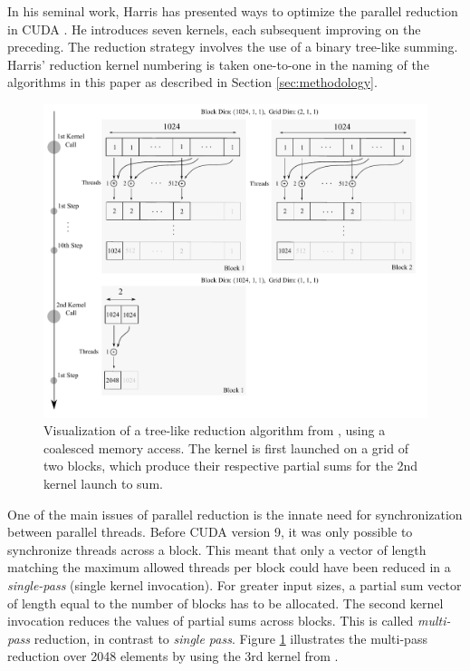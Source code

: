 \documentclass{juliacon}
\begin{document}
In his seminal work, Harris has presented ways to optimize the parallel reduction in CUDA \cite{Harris2007}. He introduces seven kernels, each subsequent improving on the preceding. The reduction strategy involves the use of a binary tree-like summing. Harris' reduction kernel numbering is taken one-to-one in the naming of the algorithms in this paper as described in Section \ref{sec:methodology}.
\begin{figure}[t]
    \centerline{\includegraphics[width=13cm]{reduction-tree.pdf}}
    \caption{Visualization of a tree-like reduction algorithm from \cite{Harris2007}, using a coalesced memory access. The kernel is first launched on a grid of two blocks, which produce their respective partial sums for the 2nd kernel launch to sum.}
    \label{fig:reduction}
\end{figure}

One of the main issues of parallel reduction is the innate need for synchronization between parallel threads. Before CUDA version 9, it was only possible to synchronize threads across a block. This meant that only a vector of length matching the maximum allowed threads per block could have been reduced in a \emph{single-pass} (single kernel invocation). For greater input sizes, a partial sum vector of length equal to the number of blocks has to be allocated. The second kernel invocation reduces the values of partial sums across blocks. This is called \emph{multi-pass} reduction, in contrast to \emph{single pass}. Figure \ref{fig:reduction} illustrates the multi-pass reduction over 2048 elements by using the 3rd kernel from \cite{Harris2007}.
\end{document}
